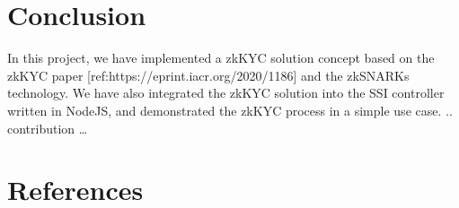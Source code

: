 \documentclass[
]{report}
\begin{document}
\chapter{Conclusion}

In this project, we have implemented a zkKYC solution concept based on
the zkKYC paper
{[}ref:https://eprint.iacr.org/2020/1186{]} and the
zkSNARKs technology. We have also integrated the zkKYC solution into the
SSI controller written in NodeJS, and demonstrated the zkKYC process in
a simple use case. .. contribution \ldots{}

\chapter{References}
\end{document}
